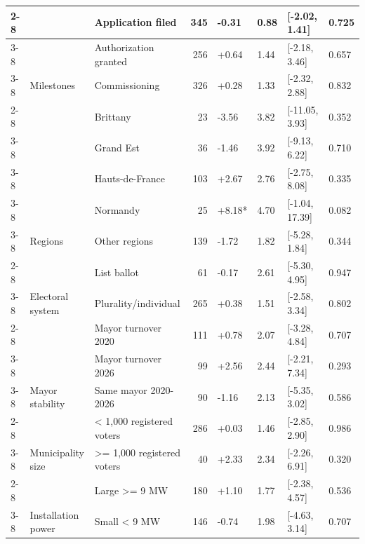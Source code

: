 \begin{ThreePartTable}
\begin{longtable}[t]{lllrllll}
\cmidrule{2-8}\nopagebreak
 &  & Application filed & 345 & -0.31 & 0.88 & {}[-2.02, 1.41] & 0.725\\
\cmidrule{3-8}\nopagebreak
 &  & Authorization granted & 256 & +0.64 & 1.44 & {}[-2.18, 3.46] & 0.657\\
\cmidrule{3-8}\nopagebreak
 & \multirow[t]{-3}{*}{\raggedright\arraybackslash Milestones} & Commissioning & 326 & +0.28 & 1.33 & {}[-2.32, 2.88] & 0.832\\
\cmidrule{2-8}\nopagebreak
 &  & Brittany & 23 & -3.56 & 3.82 & {}[-11.05, 3.93] & 0.352\\
\cmidrule{3-8}\nopagebreak
 &  & Grand Est & 36 & -1.46 & 3.92 & {}[-9.13, 6.22] & 0.710\\
\cmidrule{3-8}\nopagebreak
 &  & Hauts-de-France & 103 & +2.67 & 2.76 & {}[-2.75, 8.08] & 0.335\\
\cmidrule{3-8}\nopagebreak
 &  & Normandy & 25 & +8.18* & 4.70 & {}[-1.04, 17.39] & 0.082\\
\cmidrule{3-8}\nopagebreak
 & \multirow[t]{-5}{*}{\raggedright\arraybackslash Regions} & Other regions & 139 & -1.72 & 1.82 & {}[-5.28, 1.84] & 0.344\\
\cmidrule{2-8}\nopagebreak
 &  & List ballot & 61 & -0.17 & 2.61 & {}[-5.30, 4.95] & 0.947\\
\cmidrule{3-8}\nopagebreak
 & \multirow[t]{-2}{*}{\raggedright\arraybackslash Electoral system} & Plurality/individual & 265 & +0.38 & 1.51 & {}[-2.58, 3.34] & 0.802\\
\cmidrule{2-8}\nopagebreak
 &  & Mayor turnover 2020 & 111 & +0.78 & 2.07 & {}[-3.28, 4.84] & 0.707\\
\cmidrule{3-8}\nopagebreak
 &  & Mayor turnover 2026 & 99 & +2.56 & 2.44 & {}[-2.21, 7.34] & 0.293\\
\cmidrule{3-8}\nopagebreak
 & \multirow[t]{-3}{*}{\raggedright\arraybackslash Mayor stability} & Same mayor 2020-2026 & 90 & -1.16 & 2.13 & {}[-5.35, 3.02] & 0.586\\
\cmidrule{2-8}\nopagebreak
 &  & < 1,000 registered voters & 286 & +0.03 & 1.46 & {}[-2.85, 2.90] & 0.986\\
\cmidrule{3-8}\nopagebreak
 & \multirow[t]{-2}{*}{\raggedright\arraybackslash Municipality size} & >= 1,000 registered voters & 40 & +2.33 & 2.34 & {}[-2.26, 6.91] & 0.320\\
\cmidrule{2-8}\nopagebreak
 &  & Large >= 9 MW & 180 & +1.10 & 1.77 & {}[-2.38, 4.57] & 0.536\\
\cmidrule{3-8}\nopagebreak
 & \multirow[t]{-2}{*}{\raggedright\arraybackslash Installation power} & Small < 9 MW & 146 & -0.74 & 1.98 & {}[-4.63, 3.14] & 0.707\\

\end{longtable}
\end{ThreePartTable}
